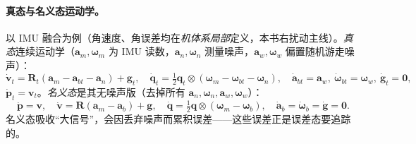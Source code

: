 \paragraph{真态与名义态运动学。}
以 IMU 融合为例（角速度、角误差均在\emph{机体系局部}定义，本书右扰动主线）。\emph{真态}连续运动学（$\mathbf{a}_m,\boldsymbol{\omega}_m$ 为 IMU 读数，$\mathbf{a}_n,\boldsymbol{\omega}_n$ 测量噪声，$\mathbf{a}_w,\boldsymbol{\omega}_w$ 偏置随机游走噪声）\cite{sola2017quaternion}：
\begin{equation}
  \dot{\mathbf{v}}_t=\mathbf{R}_t(\mathbf{a}_m-\mathbf{a}_{bt}-\mathbf{a}_n)+\mathbf{g}_t,\quad
  \dot{\mathbf{q}}_t=\tfrac12\mathbf{q}_t\otimes(\boldsymbol{\omega}_m-\boldsymbol{\omega}_{bt}-\boldsymbol{\omega}_n),\quad
  \dot{\mathbf{a}}_{bt}=\mathbf{a}_w,\ \dot{\boldsymbol{\omega}}_{bt}=\boldsymbol{\omega}_w,\ \dot{\mathbf{g}}_t=\mathbf{0},
  \label{eq:eskf-true-kin}
\end{equation}
$\dot{\mathbf{p}}_t=\mathbf{v}_t$。\emph{名义态}是其无噪声版（去掉所有 $\mathbf{a}_n,\boldsymbol{\omega}_n,\mathbf{a}_w,\boldsymbol{\omega}_w$）：
\begin{equation}
  \dot{\mathbf{p}}=\mathbf{v},\quad
  \dot{\mathbf{v}}=\mathbf{R}(\mathbf{a}_m-\mathbf{a}_b)+\mathbf{g},\quad
  \dot{\mathbf{q}}=\tfrac12\mathbf{q}\otimes(\boldsymbol{\omega}_m-\boldsymbol{\omega}_b),\quad
  \dot{\mathbf{a}}_b=\dot{\boldsymbol{\omega}}_b=\dot{\mathbf{g}}=\mathbf{0}.
  \label{eq:eskf-nominal-kin}
\end{equation}
名义态吸收“大信号”，会因丢弃噪声而累积误差——这些误差正是误差态要追踪的。

